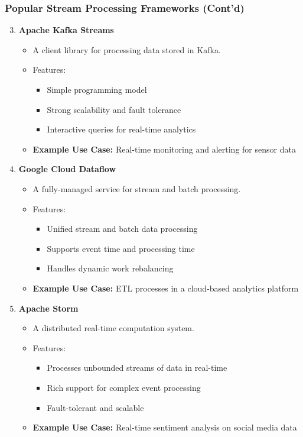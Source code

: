 \documentclass[aspectratio=169]{beamer}
\begin{document}
\begin{frame}
    \frametitle{Popular Stream Processing Frameworks (Cont'd)}
    \begin{enumerate}
        \setcounter{enumi}{2}
        \item \textbf{Apache Kafka Streams}
        \begin{itemize}
            \item A client library for processing data stored in Kafka.
            \item Features:
            \begin{itemize}
                \item Simple programming model
                \item Strong scalability and fault tolerance
                \item Interactive queries for real-time analytics
            \end{itemize}
            \item \textbf{Example Use Case:} Real-time monitoring and alerting for sensor data
        \end{itemize}

        \item \textbf{Google Cloud Dataflow}
        \begin{itemize}
            \item A fully-managed service for stream and batch processing.
            \item Features:
            \begin{itemize}
                \item Unified stream and batch data processing
                \item Supports event time and processing time
                \item Handles dynamic work rebalancing
            \end{itemize}
            \item \textbf{Example Use Case:} ETL processes in a cloud-based analytics platform
        \end{itemize}

        \item \textbf{Apache Storm}
        \begin{itemize}
            \item A distributed real-time computation system.
            \item Features:
            \begin{itemize}
                \item Processes unbounded streams of data in real-time
                \item Rich support for complex event processing
                \item Fault-tolerant and scalable
            \end{itemize}
            \item \textbf{Example Use Case:} Real-time sentiment analysis on social media data
        \end{itemize}
    \end{enumerate}
\end{frame}
\end{document}
